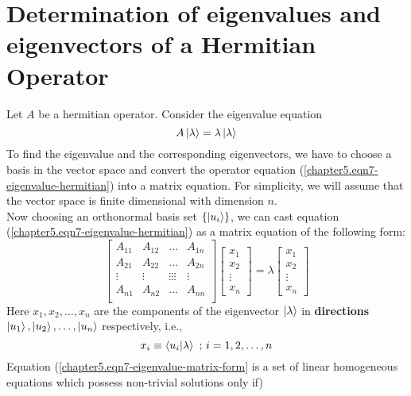 \section{Determination of eigenvalues and eigenvectors of a Hermitian Operator}
	Let $A$ be a hermitian operator. Consider the eigenvalue equation
	\begin{equation}
		A \ket{\lambda} = \lambda \ket{\lambda}
		\label{chapter5.eqn7-eigenvalue-hermitian}
	\end{equation}
	To find the eigenvalue and the corresponding eigenvectors, we have to choose a basis in the vector space and convert the operator equation (\ref{chapter5.eqn7-eigenvalue-hermitian}) into a matrix equation. For simplicity, we will assume that the vector space is finite dimensional with dimension $n$. \\
	Now choosing an orthonormal basis set $\{\ket{u_i}\}$, we can cast equation (\ref{chapter5.eqn7-eigenvalue-hermitian}) as a matrix equation of the following form:
	\begin{equation}
		\left[
		\begin{matrix}
			A_{11} & A_{12} & \ldots & A_{1n} \\
			A_{21} & A_{22} & \ldots & A_{2n} \\
			\vdots & \vdots & \vdots \vdots \vdots & \vdots \\
			A_{n1} & A_{n2} & \ldots & A_{nn} \\
		\end{matrix}
		\right]\left[
		\begin{matrix}
			x_1 \\ x_2 \\ \vdots \\ x_n
		\end{matrix}
		\right]
		=
		\lambda
		\left[
		\begin{matrix}
			x_1 \\ x_2 \\ \vdots \\ x_n
		\end{matrix}
		\right]
		\label{chapter5.eqn7-eigenvalue-matrix-form}
	\end{equation}
	Here $x_1, x_2, \ldots, x_n$ are the components of the eigenvector $\ket{\lambda}$ in \textbf{directions} $\ket{u_1}, \ket{u_2}, \ldots, \ket{u_n}$ respectively, i.e.,
	\begin{equation}
		x_i \equiv \braket{u_i}{\lambda} \text{ ; } i=1,2,\ldots,n
	\end{equation}
	Equation (\ref{chapter5.eqn7-eigenvalue-matrix-form} is a set of linear homogeneous equations which possess non-trivial solutions only if)


